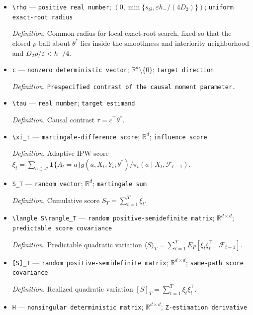 \documentclass{article}
\begin{document}
\begin{itemize}
  \item \texttt{\textbackslash{}\allowbreak{}rho} --- \texttt{positive real number}; \((0,\min\{s_\Theta,\varepsilon h_-/(4D_2)\})\); \texttt{uniform exact-\allowbreak{}root radius}
  \par\smallskip\noindent\emph{Definition.} Common radius for local exact-root search, fixed so that the closed \(\rho\)-ball about \(\theta^*\) lies inside the smoothness and interiority neighborhood and \(D_2\rho/\varepsilon<h_-/4\).
  \item \texttt{c} --- \texttt{nonzero deterministic vector}; \(\mathbb R^d\setminus\{0\}\); \texttt{target direction}
  \par\smallskip\noindent\emph{Definition.} \texttt{Prespecified contrast of the causal moment parameter.}
  \item \texttt{\textbackslash{}\allowbreak{}tau} --- \texttt{real number}; \texttt{target estimand}
  \par\smallskip\noindent\emph{Definition.} Causal contrast \(\tau=c^\top\theta^*\).
  \item \texttt{\textbackslash{}\allowbreak{}xi\_\allowbreak{}t} --- \texttt{martingale-\allowbreak{}difference score}; \(\mathbb R^d\); \texttt{influence score}
  \par\smallskip\noindent\emph{Definition.} Adaptive IPW score \(\xi_t=\sum_{a\in\mathcal A}\mathbf 1\{A_t=a\}g(a,X_t,Y_t;\theta^*)/\pi_t(a\mid X_t,\mathcal F_{t-1})\).
  \item \texttt{S\_\allowbreak{}T} --- \texttt{random vector}; \(\mathbb R^d\); \texttt{martingale sum}
  \par\smallskip\noindent\emph{Definition.} Cumulative score \(S_T=\sum_{t=1}^T\xi_t\).
  \item \texttt{\textbackslash{}\allowbreak{}langle S\textbackslash{}\allowbreak{}rangle\_\allowbreak{}T} --- \texttt{random positive-\allowbreak{}semidefinite matrix}; \(\mathbb R^{d\times d}\); \texttt{predictable score covariance}
  \par\smallskip\noindent\emph{Definition.} Predictable quadratic variation \(\langle S\rangle_T=\sum_{t=1}^TE_P[\xi_t\xi_t^\top\mid\mathcal F_{t-1}]\).
  \item \texttt{[S]\_\allowbreak{}T} --- \texttt{random positive-\allowbreak{}semidefinite matrix}; \(\mathbb R^{d\times d}\); \texttt{same-\allowbreak{}path score covariance}
  \par\smallskip\noindent\emph{Definition.} Realized quadratic variation \([S]_T=\sum_{t=1}^T\xi_t\xi_t^\top\).
  \item \texttt{H} --- \texttt{nonsingular deterministic matrix}; \(\mathbb R^{d\times d}\); \texttt{Z-\allowbreak{}estimation derivative}

\end{itemize}
\end{document}
